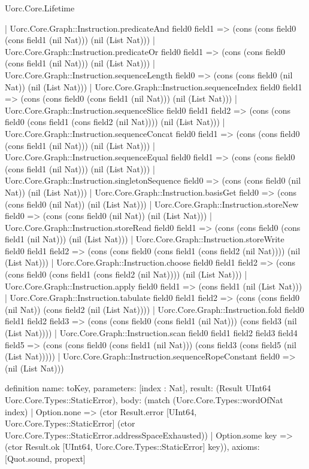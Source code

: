 \begin{lexlean}{Uorc.Core.Lifetime}
\begin{semanticmodule}
{    | Uorc.Core.Graph::Instruction.predicateAnd field0 field1 => (cons (cons field0 (cons field1 (nil Nat))) (nil (List Nat)))
    | Uorc.Core.Graph::Instruction.predicateOr field0 field1 => (cons (cons field0 (cons field1 (nil Nat))) (nil (List Nat)))
    | Uorc.Core.Graph::Instruction.sequenceLength field0 => (cons (cons field0 (nil Nat)) (nil (List Nat)))
    | Uorc.Core.Graph::Instruction.sequenceIndex field0 field1 => (cons (cons field0 (cons field1 (nil Nat))) (nil (List Nat)))
    | Uorc.Core.Graph::Instruction.sequenceSlice field0 field1 field2 => (cons (cons field0 (cons field1 (cons field2 (nil Nat)))) (nil (List Nat)))
    | Uorc.Core.Graph::Instruction.sequenceConcat field0 field1 => (cons (cons field0 (cons field1 (nil Nat))) (nil (List Nat)))
    | Uorc.Core.Graph::Instruction.sequenceEqual field0 field1 => (cons (cons field0 (cons field1 (nil Nat))) (nil (List Nat)))
    | Uorc.Core.Graph::Instruction.singletonSequence field0 => (cons (cons field0 (nil Nat)) (nil (List Nat)))
    | Uorc.Core.Graph::Instruction.basisGet field0 => (cons (cons field0 (nil Nat)) (nil (List Nat)))
    | Uorc.Core.Graph::Instruction.storeNew field0 => (cons (cons field0 (nil Nat)) (nil (List Nat)))
    | Uorc.Core.Graph::Instruction.storeRead field0 field1 => (cons (cons field0 (cons field1 (nil Nat))) (nil (List Nat)))
    | Uorc.Core.Graph::Instruction.storeWrite field0 field1 field2 => (cons (cons field0 (cons field1 (cons field2 (nil Nat)))) (nil (List Nat)))
    | Uorc.Core.Graph::Instruction.choose field0 field1 field2 => (cons (cons field0 (cons field1 (cons field2 (nil Nat)))) (nil (List Nat)))
    | Uorc.Core.Graph::Instruction.apply field0 field1 => (cons field1 (nil (List Nat)))
    | Uorc.Core.Graph::Instruction.tabulate field0 field1 field2 => (cons (cons field0 (nil Nat)) (cons field2 (nil (List Nat))))
    | Uorc.Core.Graph::Instruction.fold field0 field1 field2 field3 => (cons (cons field0 (cons field1 (nil Nat))) (cons field3 (nil (List Nat))))
    | Uorc.Core.Graph::Instruction.scan field0 field1 field2 field3 field4 field5 => (cons (cons field0 (cons field1 (nil Nat))) (cons field3 (cons field5 (nil (List Nat)))))
    | Uorc.Core.Graph::Instruction.sequenceRopeConstant field0 => (nil (List Nat)))
}

definition{
  name: toKey,
  parameters: [index : Nat],
  result: (Result UInt64 Uorc.Core.Types::StaticError),
  body: (match (Uorc.Core.Types::wordOfNat index)
    | Option.none => (ctor Result.error [UInt64, Uorc.Core.Types::StaticError] (ctor Uorc.Core.Types::StaticError.addressSpaceExhausted))
    | Option.some key => (ctor Result.ok [UInt64, Uorc.Core.Types::StaticError] key)),
  axioms: [Quot.sound, propext]
}


\end{semanticmodule}
\end{lexlean}
